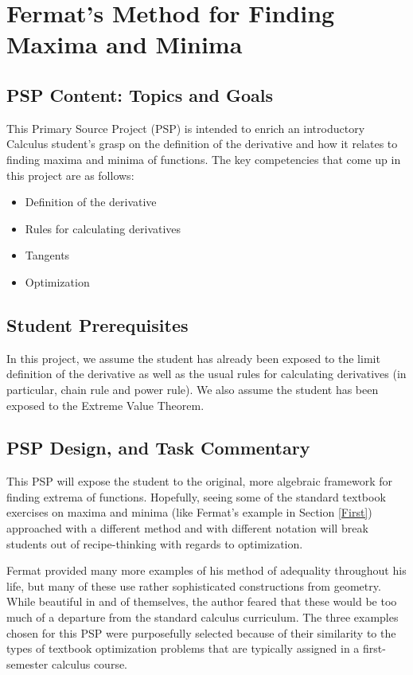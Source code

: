 \section{Fermat's Method for Finding Maxima and Minima}

\subsection*{PSP Content: Topics and Goals}

This Primary Source Project (PSP) is intended to enrich an
introductory Calculus student's grasp on the definition of the
derivative and how it relates to finding maxima and minima of
functions.  The key competencies that come up in this project are as
follows:
\begin{itemize}
    \item Definition of the derivative
    \item Rules for calculating derivatives
    \item Tangents
    \item Optimization
\end{itemize}


\subsection*{Student Prerequisites}

In this project, we assume the student has already been exposed to the
limit definition of the derivative as well as the usual rules for
calculating derivatives (in particular, chain rule and power rule).
We also assume the student has been exposed to the Extreme Value
Theorem.

\subsection*{PSP Design, and Task Commentary}

This PSP will expose the student to the original, more algebraic
framework for finding extrema of functions.  Hopefully, seeing some of
the standard textbook exercises on maxima and minima (like Fermat's
example in Section \ref{First}) approached with a different method and
with different notation will break students out of recipe-thinking
with regards to optimization.

Fermat provided many more examples of his method of adequality
throughout his life, but many of these use rather sophisticated
constructions from geometry.  While beautiful in and of themselves,
the author feared that these would be too much of a departure from the
standard calculus curriculum.  The three examples chosen for this PSP
were purposefully selected because of their similarity to the types of
textbook optimization problems that are typically assigned in a
first-semester calculus course.

